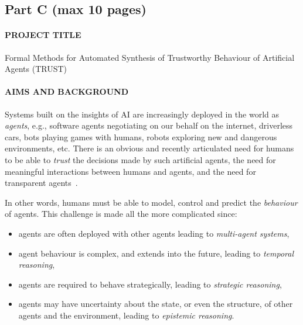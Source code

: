 \documentclass[a4paper,12pt,smallheadings]{scrartcl}
\def\TITLE{Formal Methods for Automated Synthesis of Trustworthy Behaviour of Artificial Agents (TRUST)}
\begin{document}
\newpage

\subsection*{Part C (max 10 pages)}
\paragraph{PROJECT TITLE}
\TITLE

\paragraph{AIMS AND BACKGROUND}




Systems built on the insights of AI are increasingly deployed in the world as \emph{agents}, 
e.g., software agents negotiating on our behalf on the internet, driverless cars, bots playing games with humans, 
robots exploring new and dangerous environments, etc. There is an obvious and recently articulated need for humans to 
be able to \emph{trust} the decisions made by such artificial agents, 
the need for {meaningful interactions} between humans and agents, and the need for {transparent} agents~\cite{ACMStatement07}. 

In other words, humans must be able to model, control and predict the \emph{behaviour} of agents. This challenge is made 
all the more complicated since:
\begin{itemize} 
 \item agents are often deployed with other agents leading to \emph{multi-agent systems},
 \item agent behaviour is complex, and extends into the future, leading to \emph{temporal reasoning},
 \item agents are required to behave strategically, leading to \emph{strategic reasoning},
 \item agents may have uncertainty about the state, or even the structure, of other agents and the environment, leading to \emph{epistemic reasoning}.
\end{itemize}
\end{document}
